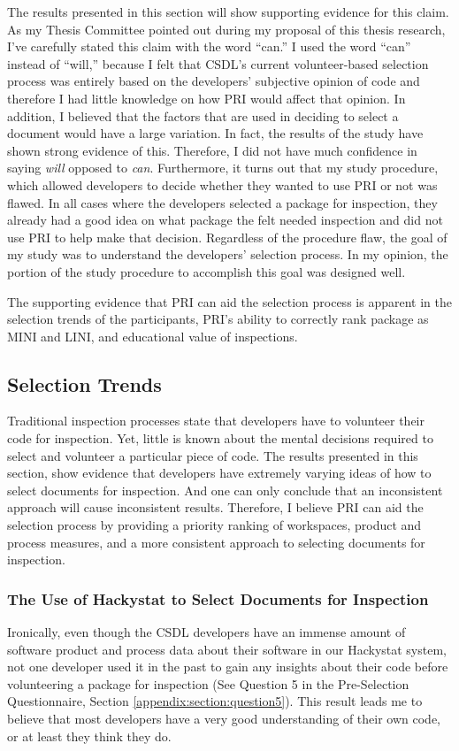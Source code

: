 The results presented in this section will show supporting evidence for
this claim. As my Thesis Committee pointed out during my proposal of this
thesis research, I've carefully stated this claim with the word ``can.''  I
used the word ``can'' instead of ``will,'' because I felt that CSDL's
current volunteer-based selection process was entirely based on the
developers' subjective opinion of code and therefore I had little knowledge
on how PRI would affect that opinion. In addition, I believed that the
factors that are used in deciding to select a document would have a large
variation. In fact, the results of the study have shown strong evidence of
this. Therefore, I did not have much confidence in saying \textit{will}
opposed to \textit{can}. Furthermore, it turns out that my study procedure,
which allowed developers to decide whether they wanted to use PRI or not
was flawed. In all cases where the developers selected a package for
inspection, they already had a good idea on what package the felt needed
inspection and did not use PRI to help make that decision. Regardless of
the procedure flaw, the goal of my study was to understand the developers'
selection process. In my opinion, the portion of the study procedure to
accomplish this goal was designed well.

The supporting evidence that PRI can aid the selection process is apparent
in the selection trends of the participants, PRI's ability to correctly
rank package as MINI and LINI, and educational value of inspections.



\subsection{Selection Trends}
Traditional inspection processes state that developers have to volunteer
their code for inspection. Yet, little is known about the mental decisions
required to select and volunteer a particular piece of code. The results
presented in this section, show evidence that developers have extremely
varying ideas of how to select documents for inspection. And one can only
conclude that an inconsistent approach will cause inconsistent results.
Therefore, I believe PRI can aid the selection process by providing a
priority ranking of workspaces, product and process measures, and a more
consistent approach to selecting documents for inspection.


\subsubsection{The Use of Hackystat to Select Documents for Inspection}
Ironically, even though the CSDL developers have an immense amount of
software product and process data about their software in our Hackystat
system, not one developer used it in the past to gain any insights about
their code before volunteering a package for inspection (See Question 5 in
the Pre-Selection Questionnaire, Section \ref{appendix:section:question5}). This
result leads me to believe that most developers have a very good
understanding of their own code, or at least they think they do.



